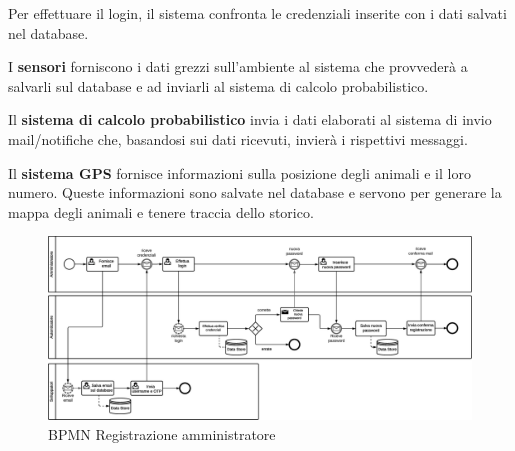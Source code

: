 Per effettuare il login, il sistema confronta le credenziali inserite con i dati salvati nel database.

\vspace{5mm}
\noindent
I \textbf{sensori} forniscono i dati grezzi sull'ambiente al sistema che provvederà a salvarli sul database e ad inviarli al sistema di calcolo probabilistico.

\vspace{5mm}
\noindent
Il \textbf{sistema di calcolo probabilistico} invia i dati elaborati al sistema di invio mail/notifiche che, basandosi sui dati ricevuti, invierà i rispettivi messaggi. 

\vspace{5mm}
\noindent
Il \textbf{sistema GPS} fornisce informazioni sulla posizione degli animali e il loro numero. Queste informazioni sono salvate nel database e servono per generare la mappa degli animali e tenere traccia dello storico.


\begin{figure}[ht]
    \centering
    \includegraphics[scale=0.26]{Img/BPMN_reg_amministratore.eps}
    \caption{BPMN Registrazione amministratore}
    \label{fig:reg_amm}
\end{figure}